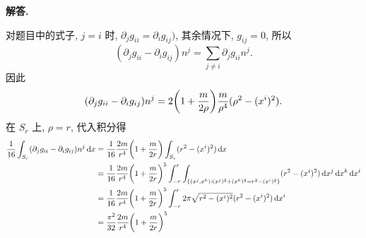 \documentclass{ctexart}
\newenvironment{solution}{\par\noindent\textbf{解答. }}{\par}
\begin{document}
\begin{solution}
\begin{enumerate}
        对题目中的式子, $j = i$ 时, $\partial_j g_{ii} = \partial_i g_{ij})$, 其余情况下, $g_{ij} = 0$, 所以
        \[
            (\partial_j g_{ii} - \partial_i g_{ij})n^j = \sum_{j \not= i} \partial_j g_{ii} n^j.
        \]
        因此
        \[
            (\partial_j g_{ii} - \partial_i g_{ij})n^j = 2 \biggl( 1 + \dfrac{m}{2 \rho}\biggr) \dfrac{m}{\rho^4}(\rho^2 - (x^i)^2).
        \]
        在 $S_r$ 上, $\rho = r$, 代入积分得
        \[
            \begin{aligned}
            \frac{1}{16}\int_{S_r} (\partial_j g_{ii} - \partial_i g_{ij})n^j \mathop{}\!\mathrm{d} x 
            ={} & \dfrac{1}{16}\dfrac{2m}{r^4}\biggl( 1 + \dfrac{m}{2 r}\biggr) \int_{S_r} (r^2 - (x^i) ^2) \mathop{}\!\mathrm{d} x \\
            ={} & \dfrac{1}{16} \dfrac{2m}{r^4}\biggl( 1 + \dfrac{m}{2 r}\biggr)^5 \int_{-r}^{r}\int_{\{(x^j, x^k) : (x^j)^2 + (x^k)^2 = r^2 - (x^i)^2\}}(r^2 - (x^i) ^2) \mathop{}\!\mathrm{d} x^j \mathop{}\!\mathrm{d} x^k \mathop{}\!\mathrm{d} x^i \\
            ={} & \dfrac{1}{16} \dfrac{2m}{r^4}\biggl( 1 + \dfrac{m}{2 r}\biggr)^5 \int_{-r}^{r} 2\pi\sqrt{r^2 - (x^i)^2}(r^2 - (x^i)^2) \mathop{}\!\mathrm{d} x^i \\
            ={} & \dfrac{\pi^2}{32} \dfrac{2m}{r^4}\biggl( 1 + \dfrac{m}{2 r}\biggr)^5
            \end{aligned}
        \]
    \end{enumerate}
\end{solution}

\newpage
\end{document}
